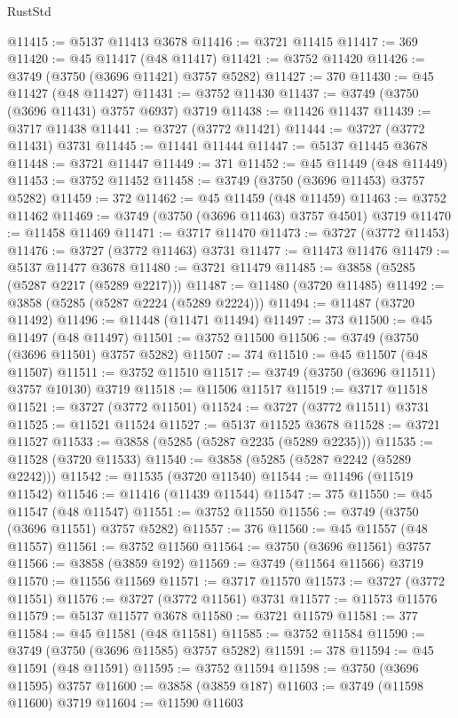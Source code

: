 \begin{lexlean}{RustStd}
\begin{coremodule}
@11415 := @5137 @11413 @3678
@11416 := @3721 @11415
@11417 := 369
@11420 := @45 @11417 (@48 @11417)
@11421 := @3752 @11420
@11426 := @3749 (@3750 (@3696 @11421) @3757 @5282)
@11427 := 370
@11430 := @45 @11427 (@48 @11427)
@11431 := @3752 @11430
@11437 := @3749 (@3750 (@3696 @11431) @3757 @6937) @3719
@11438 := @11426 @11437
@11439 := @3717 @11438
@11441 := @3727 (@3772 @11421)
@11444 := @3727 (@3772 @11431) @3731
@11445 := @11441 @11444
@11447 := @5137 @11445 @3678
@11448 := @3721 @11447
@11449 := 371
@11452 := @45 @11449 (@48 @11449)
@11453 := @3752 @11452
@11458 := @3749 (@3750 (@3696 @11453) @3757 @5282)
@11459 := 372
@11462 := @45 @11459 (@48 @11459)
@11463 := @3752 @11462
@11469 := @3749 (@3750 (@3696 @11463) @3757 @4501) @3719
@11470 := @11458 @11469
@11471 := @3717 @11470
@11473 := @3727 (@3772 @11453)
@11476 := @3727 (@3772 @11463) @3731
@11477 := @11473 @11476
@11479 := @5137 @11477 @3678
@11480 := @3721 @11479
@11485 := @3858 (@5285 (@5287 @2217 (@5289 @2217)))
@11487 := @11480 (@3720 @11485)
@11492 := @3858 (@5285 (@5287 @2224 (@5289 @2224)))
@11494 := @11487 (@3720 @11492)
@11496 := @11448 (@11471 @11494)
@11497 := 373
@11500 := @45 @11497 (@48 @11497)
@11501 := @3752 @11500
@11506 := @3749 (@3750 (@3696 @11501) @3757 @5282)
@11507 := 374
@11510 := @45 @11507 (@48 @11507)
@11511 := @3752 @11510
@11517 := @3749 (@3750 (@3696 @11511) @3757 @10130) @3719
@11518 := @11506 @11517
@11519 := @3717 @11518
@11521 := @3727 (@3772 @11501)
@11524 := @3727 (@3772 @11511) @3731
@11525 := @11521 @11524
@11527 := @5137 @11525 @3678
@11528 := @3721 @11527
@11533 := @3858 (@5285 (@5287 @2235 (@5289 @2235)))
@11535 := @11528 (@3720 @11533)
@11540 := @3858 (@5285 (@5287 @2242 (@5289 @2242)))
@11542 := @11535 (@3720 @11540)
@11544 := @11496 (@11519 @11542)
@11546 := @11416 (@11439 @11544)
@11547 := 375
@11550 := @45 @11547 (@48 @11547)
@11551 := @3752 @11550
@11556 := @3749 (@3750 (@3696 @11551) @3757 @5282)
@11557 := 376
@11560 := @45 @11557 (@48 @11557)
@11561 := @3752 @11560
@11564 := @3750 (@3696 @11561) @3757
@11566 := @3858 (@3859 @192)
@11569 := @3749 (@11564 @11566) @3719
@11570 := @11556 @11569
@11571 := @3717 @11570
@11573 := @3727 (@3772 @11551)
@11576 := @3727 (@3772 @11561) @3731
@11577 := @11573 @11576
@11579 := @5137 @11577 @3678
@11580 := @3721 @11579
@11581 := 377
@11584 := @45 @11581 (@48 @11581)
@11585 := @3752 @11584
@11590 := @3749 (@3750 (@3696 @11585) @3757 @5282)
@11591 := 378
@11594 := @45 @11591 (@48 @11591)
@11595 := @3752 @11594
@11598 := @3750 (@3696 @11595) @3757
@11600 := @3858 (@3859 @187)
@11603 := @3749 (@11598 @11600) @3719
@11604 := @11590 @11603

\end{coremodule}
\end{lexlean}
